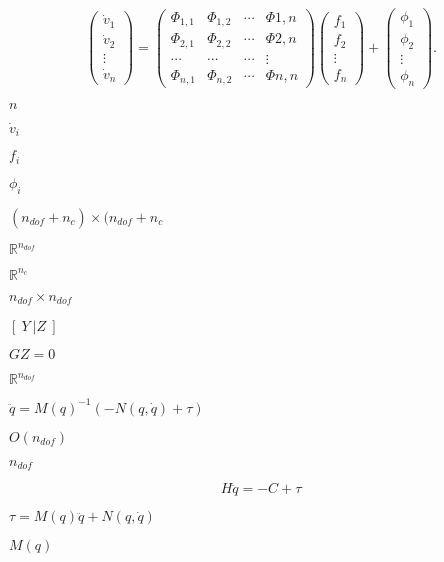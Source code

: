 \documentclass{article}
\begin{document}
\[ \left( \begin{array}{c} \dot{v}_1 \\ \dot{v}_2 \\ \vdots \\ \dot{v}_n \end{array} \right) = \left( \begin{array}{cccc} \Phi_{1,1} & \Phi_{1,2} & \cdots & \Phi{1,n} \\ \Phi_{2,1} & \Phi_{2,2} & \cdots & \Phi{2,n} \\ \cdots & \cdots & \cdots & \vdots \\ \Phi_{n,1} & \Phi_{n,2} & \cdots & \Phi{n,n} \end{array} \right) \left( \begin{array}{c} f_1 \\ f_2 \\ \vdots \\ f_n \end{array} \right) + \left( \begin{array}{c} \phi_1 \\ \phi_2 \\ \vdots \\ \phi_n \end{array} \right). \]
\pagebreak

$n$
\pagebreak

$\dot{v}_i$
\pagebreak

$f_i$
\pagebreak

$\phi_i$
\pagebreak

$ (n_\textit{dof} + n_c) \times (n_\textit{dof} + n_c$
\pagebreak

$ \mathbb{R}^{n_\textit{dof}}$
\pagebreak

$ \mathbb{R}^{n_c}$
\pagebreak

$n_\textit{dof} \times n_\textit{dof}$
\pagebreak

$\left[ \ Y \ | Z \ \right]$
\pagebreak

$GZ = 0$
\pagebreak

$\mathbb{R}^{n_\textit{dof}}$
\pagebreak

$ \ddot{q} = M(q)^{-1} ( -N(q, \dot{q}) + \tau)$
\pagebreak

$O(n_{dof})$
\pagebreak

$n_{dof}$
\pagebreak

\[ H \ddot{q} = -C + \tau \]
\pagebreak

$ \tau = M(q) \ddot{q} + N(q, \dot{q}) $
\pagebreak

$ M(q) $
\pagebreak
\end{document}

